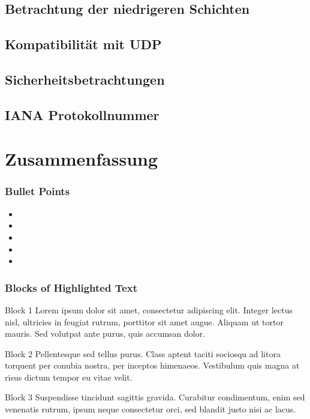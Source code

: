 \documentclass{beamer}
\begin{document}
\subsection{Betrachtung der niedrigeren Schichten}
\subsection{Kompatibilität mit UDP}
\subsection{Sicherheitsbetrachtungen}
\subsection{IANA Protokollnummer}
\section{Zusammenfassung}





\begin{frame}
\frametitle{Bullet Points}
\begin{itemize}
\item 
\item 
\item 
\item 
\item 
\end{itemize}
\end{frame}


\begin{frame}
\frametitle{Blocks of Highlighted Text}
\begin{block}{Block 1}
Lorem ipsum dolor sit amet, consectetur adipiscing elit. Integer lectus nisl, ultricies in feugiat rutrum, porttitor sit amet augue. Aliquam ut tortor mauris. Sed volutpat ante purus, quis accumsan dolor.
\end{block}

\begin{block}{Block 2}
Pellentesque sed tellus purus. Class aptent taciti sociosqu ad litora torquent per conubia nostra, per inceptos himenaeos. Vestibulum quis magna at risus dictum tempor eu vitae velit.
\end{block}

\begin{block}{Block 3}
Suspendisse tincidunt sagittis gravida. Curabitur condimentum, enim sed venenatis rutrum, ipsum neque consectetur orci, sed blandit justo nisi ac lacus.
\end{block}
\end{frame}
\end{document}
